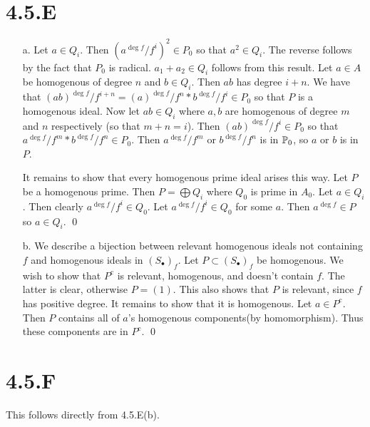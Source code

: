 \documentclass{article}
\begin{document}
\section{4.5.E}
\begin{itemize}
      \item[a.]
            Let $a \in Q_i$. Then $(a^{\deg f}/f^i)^2 \in P_0$ so that
            $a^2 \in Q_i$. The reverse follows by the fact that
            $P_0$ is radical. $a_1+a_2 \in Q_i$ follows from this
            result. Let $a \in A$ be homogenous of degree
            $n$ and $b \in Q_i$. Then $ab$
            has degree $i+n$. We have that $(ab)^{\deg f}/f^{i+n}=(a)^{\deg f}/f^{n}*b^{\deg f}/f^{i} \in P_0$ so that
            $P$ is a homogenous ideal. Now let $ab \in Q_i$
            where $a, b$ are homogenous of degree $m$
            and $n$ respectively (so that $m+n=i$). Then
            $(ab)^{\deg f}/f^{i} \in P_0$ so that $a^{\deg f}/f^{m}*b^{\deg f}/f^{n} \in P_0$. Then
            $a^{\deg f}/f^{m}$ or $b^{\deg f}/f^{n}$ is in $\P_0$,
            so $a$ or $b$ is in
            $P$.

            It remains to show that every homogenous prime ideal arises this way. Let
            $P$ be a homogenous prime. Then $P=\bigoplus Q_i$ where
            $Q_0$ is prime in $A_0$. Let
            $a \in Q_i$. Then clearly $a^{\deg f}/f^{i} \in Q_0$. Let
            $a^{\deg f}/f^{i} \in Q_0$ for some $a$. Then
            $a^{\deg f} \in P$ so $a \in Q_i$. \qed

      \item[b.] We describe a bijection between relevant homogenous ideals not containing
            $f$ and homogenous ideals in $(S_{\bullet})_f$. Let
            $P \subset (S_{\bullet})_f$ be homogenous. We wish to show that
            $P^{\text{c}}$ is relevant, homogenous, and doesn't contain
            $f$. The latter is clear, otherwise $P=(1)$.
            This also shows that $P$ is relevant, since
            $f$ has positive degree. It remains to show that it is
            homogenous. Let $a \in P^{\text{c}}$. Then $P$ contains
            all of $a$'s homogenous components(by homomorphism). Thus
            these components are in $P^{\text{c}}$. \qed
\end{itemize}

\section{4.5.F}
This follows directly from 4.5.E(b).
\end{document}
